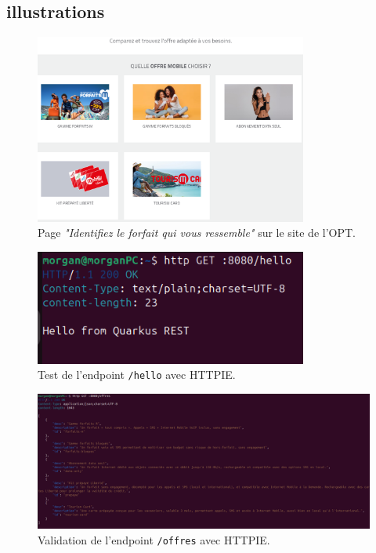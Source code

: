 \documentclass[11pt]{article}
\begin{document}
		\subsection{illustrations}
			\begin{figure}[H]
			\centering
			\includegraphics[width=0.8\textwidth]{asset/page_forfait.png}
			\caption{Page \textit{"Identifiez le forfait qui vous ressemble"} sur le site de l’OPT.}
			\label{fig:page_forfait}
		\end{figure}
		\begin{figure}[H]
			\centering
			\includegraphics[width=0.8\textwidth]{asset/hello.png}
			\caption{Test de l'endpoint \texttt{/hello} avec HTTPIE.}
			\label{fig:hello_endpoint}
		\end{figure}
		\begin{figure}[H]
			\centering
			\includegraphics[width=1\textwidth]{asset/endpoint offres.png}
			\caption{Validation de l'endpoint \texttt{/offres} avec HTTPIE.}
			\label{fig:offres_endpoint}
		\end{figure}
\end{document}

